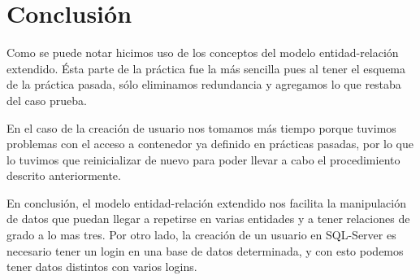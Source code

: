 \documentclass[12pt, letterpaper]{article}
\begin{document}
    \section*{Conclusión}
    Como se puede notar hicimos uso de los conceptos del modelo entidad-relación extendido.
    Ésta parte de la práctica fue la más sencilla pues al tener el esquema de la práctica
    pasada, sólo eliminamos redundancia y agregamos lo que restaba del caso prueba.\vspace{.3cm}

    En el caso de la creación de usuario nos tomamos más tiempo porque tuvimos problemas con 
    el acceso a contenedor ya definido en prácticas pasadas, por lo que lo tuvimos que 
    reinicializar de nuevo para poder llevar a cabo el procedimiento descrito anteriormente.\vspace{.3cm}

    En conclusión, el modelo entidad-relación extendido nos facilita la manipulación
    de datos que puedan llegar a repetirse en varias entidades y a tener relaciones de grado 
    a lo mas tres. Por otro lado, la creación de un usuario en SQL-Server es necesario tener un 
    login en una base de datos determinada, y con esto podemos tener datos distintos con varios
    logins.

    
\end{document}
